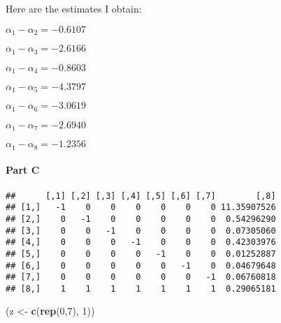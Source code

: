 \documentclass[
]{article}
\newenvironment{Shaded}{\begin{snugshade}}{\end{snugshade}}
\newcommand{\DecValTok}[1]{\textcolor[rgb]{0.00,0.00,0.81}{#1}}
\newcommand{\KeywordTok}[1]{\textcolor[rgb]{0.13,0.29,0.53}{\textbf{#1}}}
\newcommand{\NormalTok}[1]{#1}
\newcommand{\OperatorTok}[1]{\textcolor[rgb]{0.81,0.36,0.00}{\textbf{#1}}}
\newcommand{\StringTok}[1]{\textcolor[rgb]{0.31,0.60,0.02}{#1}}
\begin{document}
Here are the estimates I obtain:

\(\alpha_1-\alpha_2 = -0.6107\)

\(\alpha_1-\alpha_3 = -2.6166\)

\(\alpha_1-\alpha_4 = -0.8603\)

\(\alpha_1-\alpha_5 = -4.3797\)

\(\alpha_1-\alpha_6 = -3.0619\)

\(\alpha_1-\alpha_7 = -2.6940\)

\(\alpha_1-\alpha_8 = -1.2356\)

\hypertarget{part-c}{%
\paragraph{Part C}\label{part-c}}

\begin{Shaded}
\end{Shaded}

\begin{verbatim}
##      [,1] [,2] [,3] [,4] [,5] [,6] [,7]        [,8]
## [1,]   -1    0    0    0    0    0    0 11.35907526
## [2,]    0   -1    0    0    0    0    0  0.54296290
## [3,]    0    0   -1    0    0    0    0  0.07305060
## [4,]    0    0    0   -1    0    0    0  0.42303976
## [5,]    0    0    0    0   -1    0    0  0.01252887
## [6,]    0    0    0    0    0   -1    0  0.04679648
## [7,]    0    0    0    0    0    0   -1  0.06760818
## [8,]    1    1    1    1    1    1    1  0.29065181
\end{verbatim}

\begin{Shaded}
\begin{Highlighting}[]
\NormalTok{(z <-}\StringTok{ }\KeywordTok{c}\NormalTok{(}\KeywordTok{rep}\NormalTok{(}\DecValTok{0}\NormalTok{,}\DecValTok{7}\NormalTok{), }\DecValTok{1}\NormalTok{))}
\end{Highlighting}
\end{Shaded}
\end{document}
